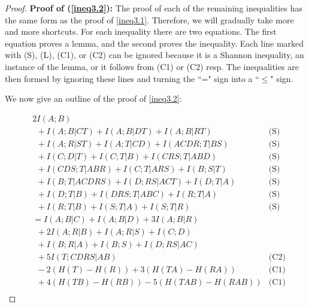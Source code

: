 \documentclass[10pt,journal]{IEEEtran}
\begin{document}
\begin{proof}
{\bf Proof of (\ref{ineq3.2}):}
The proof of each of the remaining inequalities has the same form as the proof
of \eqref{ineq3.1}.  Therefore,
we will gradually take more and more shortcuts.  For each inequality there are two equations.
The first equation proves a lemma, and the second proves the inequality.
Each line marked with (S), (L), (C1), or (C2) can be ignored because it is a
Shannon inequality, an instance of the lemma, or it follows from (C1) or (C2) resp.
The inequalities are then formed by ignoring these lines and turning the
``=" sign into a ``$\le$" sign.

We now give an outline of the proof of \eqref{ineq3.2}:

\begin{align*}
& 2I(A;B)&\\
      &\ \ + I(A;B|CT)
      + I(A;B|DT)
      + I(A;B|RT)                                                          & \text{(S)} \\
      &\ \ + I(A;R|ST)
      + I(A;T|CD)
      + I(ACDR;T|BS)                                                       & \text{(S)} \\
      &\ \ + I(C;D|T)
      + I(C;T|B)
      + I(CRS;T|ABD)                                                       & \text{(S)} \\
      &\ \ + I(CDS;T|ABR)
      + I(C;T|ARS)
      + I(B;S|T)                                                           & \text{(S)} \\
      &\ \ + I(B;T|ACDRS)
      + I(D;RS|ACT)
      + I(D;T|A)                                                           & \text{(S)} \\
      &\ \ + I(D;T|B)
      + I(DRS;T|ABC)
      + I(R;T|A)                                                           & \text{(S)} \\
      &\ \ + I(R;T|B)
      + I(S;T|A)
      + I(S;T|R)                                                           & \text{(S)} \\
   & = I(A;B|C)+I(A;B|D)+3I(A;B|R) &\\
   &\ \ +2I(A;R|B)+I(A;R|S)+I(C;D) &\\
   &\ \ +I(B;R|A)+I(B;S) +I(D;RS|AC) &\\
       &\ \ + 5I(T;CDRS|AB)                                              & \text{(C2)} \\
       &\ \ - 2(H(T)-H(R))
        + 3(H(TA)-H(RA))    & \text{(C1)} \\
        &\ \ + 4(H(TB)-H(RB))
        - 5(H(TAB)-H(RAB))                                                 & \text{(C1)} \\

\end{align*}
\end{proof}
\end{document}
